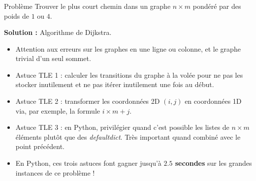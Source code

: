 \begin{frame}
    \frametitle{\problemtitle}
    \begin{block}{Problème}
        Trouver le plus court chemin dans un graphe $n \times m$ pondéré par des poids de $1$ ou $4$.
    \end{block}
    \pause
    \textbf{Solution :} Algorithme de Dijkstra.
    \pause
    \begin{itemize}[<+->]
        \item Attention aux erreurs sur les graphes en une ligne ou colonne, et le graphe trivial d'un seul sommet.
        \item Astuce TLE 1 : calculer les transitions du graphe à la volée pour ne pas les stocker inutilement et ne pas itérer inutilement une fois au début.
        \item Astuce TLE 2 : transformer les coordonnées 2D $(i,j)$ en coordonnées 1D via, par exemple, la formule $i \times m + j$.
        \item Astuce TLE 3 : en Python, privilégier quand c'est possible les listes de $n \times m$ éléments plutôt que des \emph{defaultdict}. Très important quand combiné avec le point précédent.
        \item En Python, ces trois astuces font gagner jusqu'à \textbf{$2.5$ secondes} sur les grandes instances de ce problème !
    \end{itemize}

\end{frame}